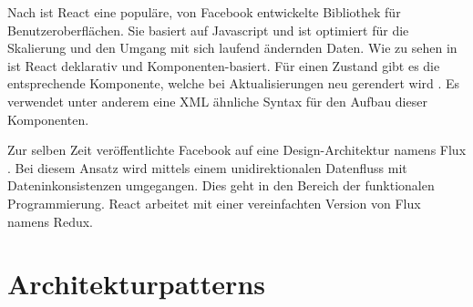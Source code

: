 

Nach \cite[S.~11-16]{reactflux} ist React eine populäre, von Facebook entwickelte Bibliothek für Benutzeroberflächen. Sie basiert auf Javascript und ist optimiert für die Skalierung und den Umgang mit sich laufend ändernden Daten. Wie zu sehen in \cite{ReactAJa3:online} ist React deklarativ und Kom\-po\-nent\-en-bas\-iert. Für einen Zustand gibt es die entsprechende Komponente, welche bei Aktualisierungen neu gerendert wird . Es verwendet unter anderem eine XML ähnliche Syntax für den Aufbau dieser Komponenten.

Zur selben Zeit veröffentlichte Facebook auf eine Design-Architektur namens Flux \cite[S.~12]{reactflux}. Bei diesem Ansatz wird mittels einem unidirektionalen Datenfluss mit Dateninkonsistenzen umgegangen. Dies geht in den Bereich der funktionalen Programmierung. React arbeitet mit einer vereinfachten Version von Flux namens Redux.



\section{Architekturpatterns}



